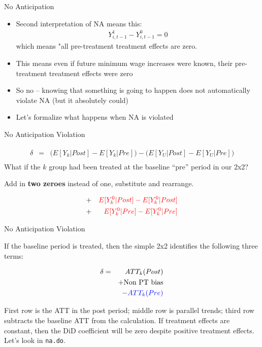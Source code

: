 \documentclass{beamer}
\begin{document}
\begin{frame}{No Anticipation}

\begin{itemize}
\item Second interpretation of NA means this:
	\begin{eqnarray*}
	Y^1_{i,t-1} - Y^0_{i,t-1}=0
	\end{eqnarray*}which means "all pre-treatment treatment effects are zero.
\item This means even if future minimum wage increases were known, their pre-treatment treatment effects were zero
\item So no -- knowing that something is going to happen does not automatically violate NA (but it absolutely could)
\item Let's formalize what happens when NA is violated

\end{itemize}

\end{frame}




\begin{frame}{No Anticipation Violation}


\begin{eqnarray*}
\widehat{\delta} &=& \bigg ( E[Y_k|Post] - E[Y_k|Pre] \bigg ) - \bigg ( E[Y_U | Post ] - E[ Y_U | Pre] \bigg) \\
\end{eqnarray*}What if the $k$ group had been treated at the baseline ``pre'' period in our 2x2?

\bigskip

Add in \textbf{two zeroes} instead of one, substitute and rearrange.

\begin{eqnarray*}
&+& \textcolor{red}{E[Y^0_k|Post] - E[Y^0_k|Post]} \\
&+& \textcolor{red}{E[Y^0_k|Pre] - E[Y^0_k|Pre]}
\end{eqnarray*}

\end{frame}

\begin{frame}{No Anticipation Violation}

If the baseline period is treated, then the simple 2x2 identifies the following three terms:

\begin{eqnarray*}
\delta &=& ATT_k(Post) \\&&+ \text{Non PT bias} \\&&- \textcolor{blue}{ATT_k(Pre)}
\end{eqnarray*}

First row is the ATT in the post period; middle row is parallel trends; third row subtracts the baseline ATT from the calculation. If treatment effects are constant, then the DiD coefficient will be zero despite positive treatment effects.  Let's look in \texttt{na.do}.

\end{frame}
\end{document}
